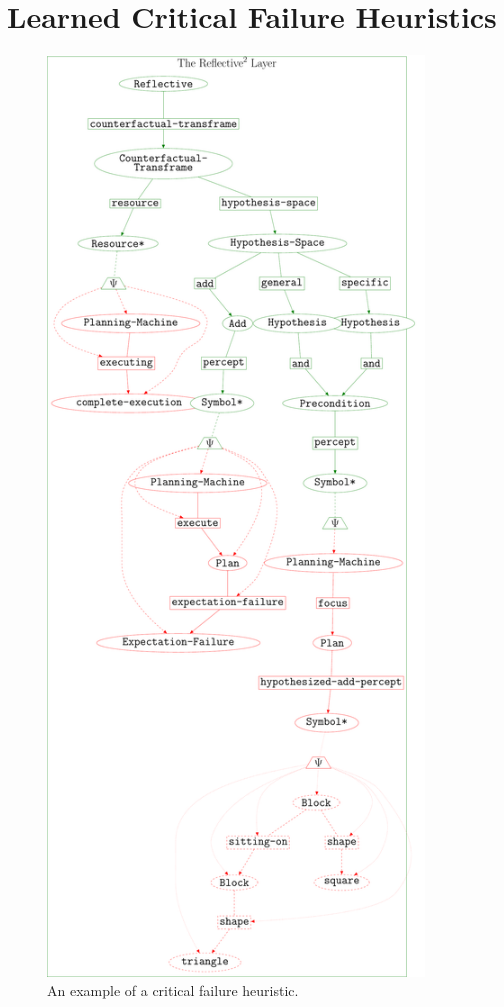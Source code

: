 \section{Learned Critical Failure Heuristics}

\begin{figure}
\includegraphics[width=10cm]{gfx/example_critical_failure_heuristic}
\caption[An example of a critical failure heuristic.]{An example of a
  critical failure heuristic.}
\label{figure:example_critical_failure_heuristic}
\end{figure}


